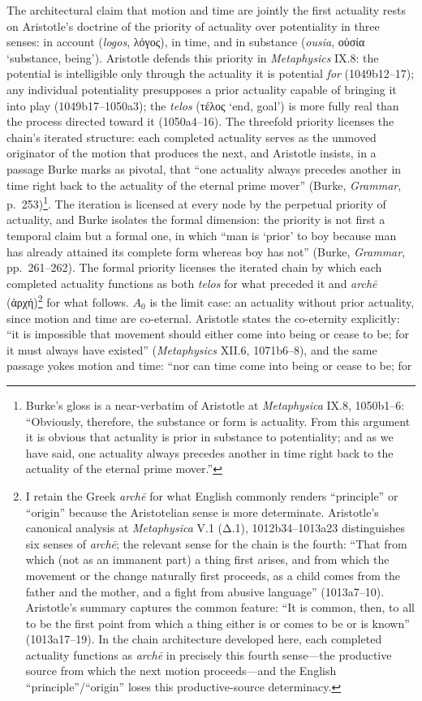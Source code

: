 \documentclass{article}
\newcommand{\gk}[1]{{\greekfont #1}}
\begin{document}
The architectural claim that motion and time are jointly the first actuality rests on Aristotle's doctrine of the priority of actuality over potentiality in three senses: in account (\textit{logos}, \gk{λόγος}), in time, and in substance (\textit{ousia}, \gk{οὐσία} `substance, being'). Aristotle defends this priority in \textit{Metaphysics} IX.8: the potential is intelligible only through the actuality it is potential \textit{for} (1049b12--17); any individual potentiality presupposes a prior actuality capable of bringing it into play (1049b17--1050a3); the \textit{telos} (\gk{τέλος} `end, goal') is more fully real than the process directed toward it (1050a4--16). The threefold priority licenses the chain's iterated structure: each completed actuality serves as the unmoved originator of the motion that produces the next, and Aristotle insists, in a passage Burke marks as pivotal, that ``one actuality always precedes another in time right back to the actuality of the eternal prime mover'' (Burke, \textit{Grammar}, p.~253)\footnote{Burke's gloss is a near-verbatim of Aristotle at \textit{Metaphysica} IX.8, 1050b1--6: ``Obviously, therefore, the substance or form is actuality. From this argument it is obvious that actuality is prior in substance to potentiality; and as we have said, one actuality always precedes another in time right back to the actuality of the eternal prime mover.''}. The iteration is licensed at every node by the perpetual priority of actuality, and Burke isolates the formal dimension: the priority is not first a temporal claim but a formal one, in which ``man is `prior' to boy because man has already attained its complete form whereas boy has not'' (Burke, \textit{Grammar}, pp.~261--262). The formal priority licenses the iterated chain by which each completed actuality functions as both \textit{telos} for what preceded it and \textit{archē} (\gk{ἀρχή})\footnote{I retain the Greek \textit{archē} for what English commonly renders ``principle'' or ``origin'' because the Aristotelian sense is more determinate. Aristotle's canonical analysis at \textit{Metaphysica} V.1 (\gk{Δ}.1), 1012b34--1013a23 distinguishes six senses of \textit{archē}; the relevant sense for the chain is the fourth: ``That from which (not as an immanent part) a thing first arises, and from which the movement or the change naturally first proceeds, as a child comes from the father and the mother, and a fight from abusive language'' (1013a7--10). Aristotle's summary captures the common feature: ``It is common, then, to all to be the first point from which a thing either is or comes to be or is known'' (1013a17--19). In the chain architecture developed here, each completed actuality functions as \textit{archē} in precisely this fourth sense---the productive source from which the next motion proceeds---and the English ``principle''/``origin'' loses this productive-source determinacy.} for what follows. $A_0$ is the limit case: an actuality without prior actuality, since motion and time are co-eternal. Aristotle states the co-eternity explicitly: ``it is impossible that movement should either come into being or cease to be; for it must always have existed'' (\textit{Metaphysics} XII.6, 1071b6--8), and the same passage yokes motion and time: ``nor can time come into being or cease to be; for 
\end{document}
